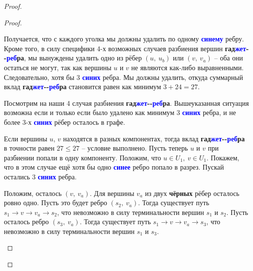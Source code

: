 \documentclass[a4paper,12pt]{article}
\begin{document}
\begin{proof}
\begin{proof}
\begin{itemize}
            Получается, что с каждого уголка мы должны удалить по одному \textbf{\textcolor{blue}{синему}} ребру. Кроме того, в силу специфики 4-х возможных случаев разбиения вершин \textbf{гад}\textbf{\textcolor{blue}{жет}}\textbf{-}\textbf{-}\textbf{\textcolor{blue}{реб}}\textbf{ра}, мы вынуждены удалить одно из рёбер $(u,\ u_b)$ или $(v,\ v_a)$ -- оба они остаться не могут, так как вершины $u$ и $v$ не являются как-либо выравненными. Следовательно, хотя бы 3 \textbf{\textcolor{blue}{синих}} ребра. Мы должны удалить, откуда суммарный вклад \textbf{гад}\textbf{\textcolor{blue}{жет}}\textbf{-}\textbf{-}\textbf{\textcolor{blue}{реб}}\textbf{ра} становится равен как минимум $3 + 24 = 27$.
            
            Посмотрим на наши 4 случая разбиения \textbf{гад}\textbf{\textcolor{blue}{жет}}\textbf{-}\textbf{-}\textbf{\textcolor{blue}{реб}}\textbf{ра}. Вышеуказанная ситуация возможна если и только если было удалено как минимум 3 \textbf{\textcolor{blue}{синих}} ребра, и не более 3-х  \textbf{\textcolor{blue}{синих}} рёбер осталось в графе.
            
            Если вершины $u$, $v$ находятся в разных компонентах, тогда вклад \textbf{гад}\textbf{\textcolor{blue}{жет}}\textbf{-}\textbf{-}\textbf{\textcolor{blue}{реб}}\textbf{ра} в точности равен $27 \leqslant 27$ -- условие выполнено.
            Пусть теперь $u$ и $v$ при разбиении попали в одну компоненту. Положим, что $u \in U_1,\ v \in U_1$. Покажем, что в этом случае ещё хотя бы одно \textbf{\textcolor{blue}{синее}} ребро попало в разрез. Пускай остались 3 \textbf{\textcolor{blue}{синих}} ребра. 
            
            Положим, осталось $(v,\ v_a)$. Для вершины $v_a$ из двух \textbf{чёрных} рёбер осталось ровно одно. Пусть это будет ребро $(s_2,\ v_a)$. Тогда существует путь $s_1 \to v \to v_a \to s_2$, что невозможно в силу терминальности вершин $s_1$ и $s_2$. Пусть осталось ребро $(s_3,\ v_a)$. Тогда существует путь $s_1 \to v \to v_a \to s_3$, что невозможно в силу терминальности вершин $s_1$ и $s_3$. 
            \begin{center}
\end{center}
\end{itemize}
\end{proof}
\end{proof}
\end{document}
